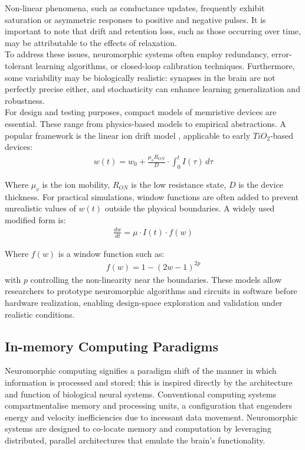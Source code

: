 \noindent Non-linear phenomena, such as conductance updates, frequently exhibit saturation or asymmetric responses to positive and negative pulses. It is important to note that drift and retention loss, such as those occurring over time, may be attributable to the effects of relaxation. \\

\noindent To address these issues, neuromorphic systems often employ redundancy, error-tolerant learning algorithms, or closed-loop calibration techniques. Furthermore, some variability may be biologically realistic: synapses in the brain are not perfectly precise either, and stochasticity can enhance learning generalization and robustness.\\

\noindent For design and testing purposes, compact models of memristive devices are essential. These range from physics-based models to empirical abstractions. A popular framework is the linear ion drift model \cite{cai2011abel}, applicable to early $TiO_2$-based devices:
\begin{align}
    w(t) = w_0 + \frac{\mu_vR_{ON}}{D} \cdot \int_{0}^{t} I(\tau)   \,d\tau  \label{eq:2.27}
\end{align}

\noindent Where $\mu_v$ is the ion mobility, $R_{ON}$ is the low resistance state, $D$ is the device thickness. For practical simulations, window functions are often added to prevent unrealistic values of $w(t)$ outside the physical boundaries. A widely used modified form is:
\begin{align}
    \frac{dw}{dt} = \mu \cdot I(t) \cdot f(w) \label{eq:2.28}
\end{align}

\noindent Where $f(w)$ is a window function such as:
\begin{align}
    f(w) = 1 - (2w - 1)^{2p} \label{eq:2.29}
\end{align}
\noindent with $p$ controlling the non-linearity near the boundaries. These models allow researchers to prototype neuromorphic algorithms and circuits in software before hardware realization, enabling design-space exploration and validation under realistic conditions.


\subsection[In-memory Computing Paradigms]{In-memory Computing Paradigms}

\noindent Neuromorphic computing signifies a paradigm shift of the manner in which information is processed and stored; this is inspired directly by the architecture and function of biological neural systems. Conventional computing systems compartmentalise memory and processing units, a configuration that engenders energy and velocity inefficiencies due to incessant data movement. Neuromorphic systems are designed to co-locate memory and computation by leveraging distributed, parallel architectures that emulate the brain's functionality.\\


